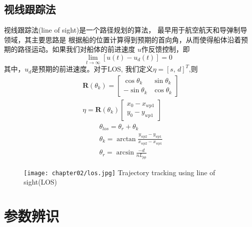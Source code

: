 \subsection{视线跟踪法}
视线跟踪法(line of sight)\cite{fossen2003line}是一个路径规划的算法，
最早用于航空航天和导弹制导领域，其主要思路是
根据船的位置计算得到预期的首向角，从而使得船体沿着预期的路径运动。如果我们对船体的前进速度
$u$作反馈控制，即
\begin{equation}
  \lim_{t \rightarrow \infty}\left[u(t)-u_{d}(t)\right]=0
\end{equation}
其中，$u_d$是预期的前进速度。对于LOS, 我们定义$\eta = [s,\, d]^T$,则
\begin{equation}
  \begin{aligned}
      & \bm{R}(\theta_k) =
      \begin{bmatrix}
        \cos \theta_k  & \sin  \theta_k  \\
        -\sin  \theta_k & \cos \theta_k
      \end{bmatrix} \\
      & \eta =\bm{R}(\theta_k)
      \begin{bmatrix}
        x_0 - x_{wp1}\\
        y_0 - y_{wp1}
      \end{bmatrix}
  \end{aligned}
\end{equation}
\begin{equation}
  \begin{aligned}
    &\theta_{los}=\theta_r + \theta_k \\
    &\theta_k=  \arctan \frac{y_{wp2} - y_{wp1} }{ x_{wp2} - x_{wp1}} \\
    & \theta_r = \arcsin \frac{-d}{nL_{pp}}
  \end{aligned}
\end{equation}


\begin{figure}[!htp]
  \centering
  \texttt{[image: chapter02/los.jpg]}
    {Trajectory tracking using line of sight(LOS)}
  \label{fig:lineofsight}
\end{figure}




\section{参数辨识}
\label{sec:parameters}
